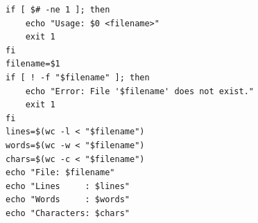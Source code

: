 \begin{verbatim}
if [ $# -ne 1 ]; then
    echo "Usage: $0 <filename>"
    exit 1
fi
filename=$1
if [ ! -f "$filename" ]; then
    echo "Error: File '$filename' does not exist."
    exit 1
fi
lines=$(wc -l < "$filename")
words=$(wc -w < "$filename")
chars=$(wc -c < "$filename")
echo "File: $filename"
echo "Lines     : $lines"
echo "Words     : $words"
echo "Characters: $chars"
\end{verbatim}